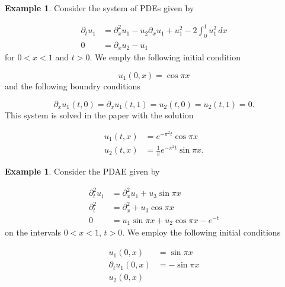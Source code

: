 \documentclass{CUP-JNL-DTM}%
\theoremstyle{definition}
\newtheorem{example}[theorem]{Example}
\numberwithin{equation}{section}
\begin{document}
\begin{example}

Consider the system of PDEs given by 

\begin{equation}
    \begin{split}
        \partial_t u_1 & = \partial_x^2 u_1 - u_2 \partial_x u_1 + u_1^2 - 2\int_0^1 u_1^2 \,dx \\
        0 & = \partial_x u_2 - u_1
    \end{split}
\end{equation}
for $0 < x < 1$ and $t > 0$. We emply the following initial condition

\begin{equation}
    u_1(0,x) = \cos \pi x
\end{equation}
and the following boundry conditions

\begin{equation}
    \partial_x u_1(t,0) = \partial_x u_1(t,1) = u_2(t,0) = u_2(t,1) = 0. 
\end{equation}
This system is solved in the paper \cite{benhammoudaAnalyticalSolutionsSystems2014} with the solution

\begin{equation}
    \begin{split}
        u_1(t,x) & = e^{-\pi^2t}\cos \pi x \\
        u_2(t,x) & = \frac{1}{\pi}e^{-\pi^2t} \sin \pi x. 
    \end{split}
\end{equation}

\end{example}

\begin{example}

Consider the PDAE given by 

\begin{equation}
    \begin{split}
        \partial_t^2 u_1 & = \partial_x^2 u_1 + u_3 \sin \pi x \\
        \partial_t^2 & = \partial_x^2 + u_3 \cos \pi x \\
        0 & = u_1 \sin \pi x + u_2 \cos \pi x - e^{-t}
    \end{split}
\end{equation}
on the intervals $0 < x < 1$, $t > 0$. We employ the following initial conditions

\begin{equation}
    \begin{split}
        u_1(0,x) & = \sin \pi x \\
        \partial_t u_1(0,x) & = -\sin \pi x \\
        u_2(0,x)
    \end{split}
\end{equation}

\end{example}
\end{document}
